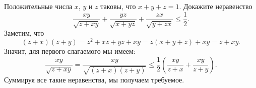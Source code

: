\problem{}
Положительные числа $x$, $y$ и $z$ таковы, что $x + y + z = 1$.
Докажите неравенство
\[
    \frac{x y}{\sqrt{z + x y}}
    +
    \frac{y z}{\sqrt{x + y z}}
    +
    \frac{z x}{\sqrt{y + z x}}
\leq
    \frac{1}{2}
.\]
\solution
Заметим, что
\[
    (z + x) (z + y)
=
    z^2 + x z + y z + x y
=
    z (x + y + z) + x y = z + x y
.\]
Значит, для первого слагаемого мы имеем:
\[
    \frac{x y}{\sqrt{z + x y}}
=
    \frac{x y}{\sqrt{(z + x) (z + y)}}
\leq
    \frac{1}{2} \left(
        \frac{xy}{z + x} + \frac{xy}{z + y}
    \right)
.\]
Суммируя все такие неравенства, мы получаем требуемое.
\endproblem
